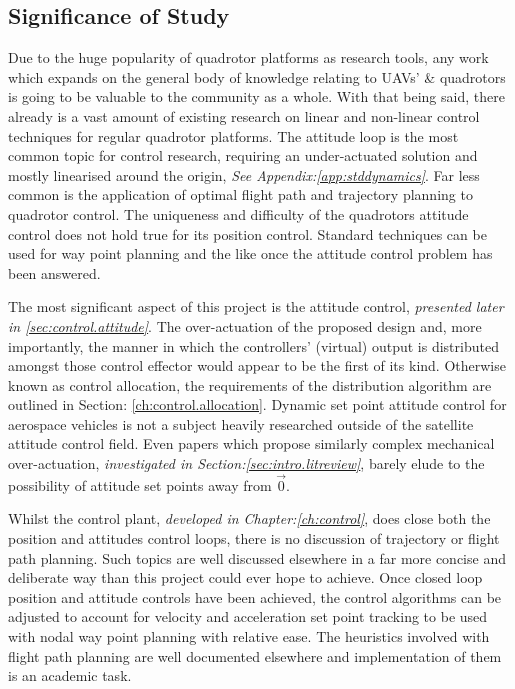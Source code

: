 \subsection{Significance of Study}
\label{subsec:intro.foreward.significance}
Due to the huge popularity of quadrotor platforms as research tools, any work which expands on the general body of knowledge relating to UAVs' \& quadrotors is going to be valuable to the community as a whole. With that being said, there already is a vast amount of existing research on linear and non-linear control techniques for regular quadrotor platforms. The attitude loop is the most common topic for control research, requiring an under-actuated solution and mostly linearised around the origin, \emph{See Appendix:\ref{app:stddynamics}}. Far less common is the application of optimal flight path and trajectory planning to quadrotor control. The uniqueness and difficulty of the quadrotors attitude control does not hold true for its position control. Standard techniques can be used for way point planning and the like once the attitude control problem has been answered.
\par
The most significant aspect of this project is the attitude control, \emph{presented later in \ref{sec:control.attitude}}. The over-actuation of the proposed design and, more importantly, the manner in which the controllers' (virtual) output is distributed amongst those control effector would appear to be the first of its kind. Otherwise known as control allocation, the requirements of the distribution algorithm are outlined in Section: \ref{ch:control.allocation}. Dynamic set point attitude control for aerospace vehicles is not a subject heavily researched outside of the satellite attitude control field. Even papers which propose similarly complex mechanical over-actuation, \emph{investigated in Section:\ref{sec:intro.litreview}}, barely elude to the possibility of attitude set points away from $\vec{0}$.
\par
Whilst the control plant, \emph{developed in Chapter:\ref{ch:control}}, does close both the position  and attitudes control loops, there is no discussion of trajectory or flight path planning. Such topics are well discussed elsewhere in a far more concise and deliberate way than this project could ever hope to achieve. Once closed loop position and attitude controls have been achieved, the control algorithms can be adjusted to account for velocity and acceleration set point tracking to be used with nodal way point planning with relative ease. The heuristics involved with flight path planning are well documented elsewhere and implementation of them is an academic task.

